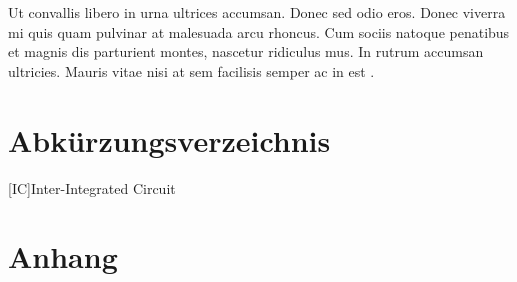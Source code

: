 \documentclass[a4paper,12pt]{article}
\begin{document}
Ut convallis libero in urna ultrices accumsan. Donec sed odio eros. Donec viverra mi quis quam pulvinar at malesuada arcu rhoncus. Cum sociis natoque penatibus et magnis dis parturient montes, nascetur ridiculus mus. In rutrum accumsan ultricies. Mauris vitae nisi at sem facilisis semper ac in est \cite{Pleisteiner.2007}.

\newpage
{}
\printbibliography
\newpage
\renewcommand{\indexname}{Stichwortverzeichnis}
\printindex
{}
\newpage
\section*{Abkürzungsverzeichnis}
\begin{acronym}[Bash]
 [IC]{Inter-Integrated Circuit}
\end{acronym}
\newpage
{}
\listoffigures
\newpage
{}
\listoftables
\newpage
\section*{Anhang}
\end{document}
